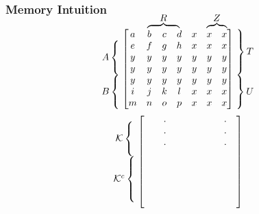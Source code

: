 \documentclass[10pt,xcolor={usenames,dvipsnames,table}]{beamer}
\newcommand\coolover[2]{\mathrlap{\smash{\overbrace{\phantom{%
    \begin{matrix} #2 \end{matrix}}}^{\mbox{$#1$}}}}#2}
\newcommand\coolleftbrace[2]{%
#1\left\{\vphantom{\begin{matrix} #2 \end{matrix}}\right.}
\newcommand\coolrightbrace[2]{%
\left.\vphantom{\begin{matrix} #1 \end{matrix}}\right\}#2}
\newcommand{\tikzmarkx}[2]{\tikz[overlay,remember picture,
  baseline=(#1.base)] \node (#1) {#2};}
\begin{document}
\begin{frame}[label=current]
    \frametitle{Memory Intuition}
    \[
\begin{matrix}%
\vphantom{a}\\
    \coolleftbrace{A}{e \\ y\\ y}\\
    \coolleftbrace{B}{y \\i \\ m}
\end{matrix}%
\begin{bmatrix}
a & \coolover{R}{b & c & d} & x & \coolover{Z}{x & x}\\
    e & f & g & h & x & x & x \\
    y & y & y & y & y & y & y \\
    y & y & y & y & y & y & y \\
    y & y & y & y & y & y & y \\
    i & j & k & l & x & x & x \\
    m & n & o  & p & x & x & x
\end{bmatrix}%
\begin{matrix}%
    \coolrightbrace{x \\ x \\ y\\ y}{T}\\
    \coolrightbrace{y \\ y \\ x }{U}
\end{matrix}
\]
\[
\begin{matrix}%
    \coolleftbrace{\mathcal{K}}{x \\ x\\ x} \\
    \coolleftbrace{\mathcal{K}^{c}}{x \\ x\\ x\\x} \\
\end{matrix}%
\begin{bmatrix}
 \tikzmarkx{left}{}&&\cdot&&&&  & & \cdot & \\
 &&\cdot&&&&  & & \cdot & \\
 &&\cdot&&&&  & & \cdot &\tikzmarkx{right}{} \\
 &&&&&& & & & \\
 &&&&&& & & & \\
 &&&&&& & & & \\
 &&&&&& & & & \\
 &&&&&& & & & \\
\end{bmatrix} 
\] 


\end{frame}
\end{document}
